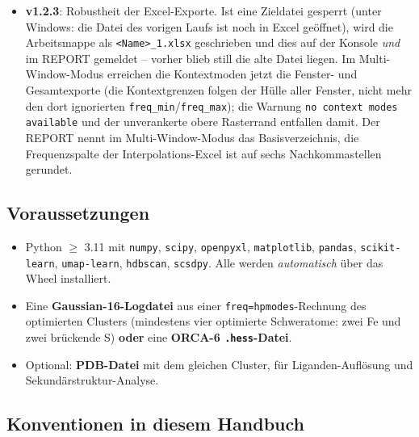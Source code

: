 \documentclass[11pt,a4paper,twoside]{article}
\theoremstyle{remark}
\begin{document}
\begin{infobox}
\begin{itemize}
        verschiedener Fenster und L\"aufe spaltenweise vergleichbar sind;
        nur ein Lauf ohne angeforderten Bereich folgt weiterhin den Daten.
        Betroffen ist die Zahl der f\"uhrenden/abschlie\ss{}enden Zeilen,
        nicht die interpolierten Werte.
  \item \textbf{v1.2.3}: Robustheit der Excel-Exporte. Ist eine
        Zieldatei gesperrt (unter Windows: die Datei des vorigen Laufs
        ist noch in Excel ge\"offnet), wird die Arbeitsmappe als
        \texttt{<Name>\_1.xlsx} geschrieben und dies auf der Konsole
        \emph{und} im REPORT gemeldet -- vorher blieb still die alte
        Datei liegen. Im Multi-Window-Modus erreichen die Kontextmoden
        jetzt die Fenster- und Gesamtexporte (die Kontextgrenzen folgen
        der H\"ulle aller Fenster, nicht mehr den dort ignorierten
        \texttt{freq\_min}/\texttt{freq\_max}); die Warnung
        \texttt{no context modes available} und der unverankerte obere
        Rasterrand entfallen damit. Der REPORT nennt im Multi-Window-Modus
        das Basisverzeichnis, die Frequenzspalte der Interpolations-Excel
        ist auf sechs Nachkommastellen gerundet.
\end{itemize}
\end{infobox}

\subsection{Voraussetzungen}

\begin{itemize}
  \item Python $\geq$ 3.11 mit \texttt{numpy}, \texttt{scipy},
        \texttt{openpyxl}, \texttt{matplotlib}, \texttt{pandas},
        \texttt{scikit-learn}, \texttt{umap-learn}, \texttt{hdbscan},
        \texttt{scsdpy}. Alle werden \emph{automatisch} \"uber das
        Wheel installiert.
  \item Eine \textbf{Gaussian-16-Logdatei} aus einer
        \texttt{freq=hpmodes}-Rechnung des optimierten Clusters
        (mindestens vier optimierte Schweratome: zwei Fe und zwei
        br\"uckende S) \textbf{oder} eine \textbf{ORCA-6
        \texttt{.hess}-Datei}.
  \item Optional: \textbf{PDB-Datei} mit dem gleichen Cluster, f\"ur
        Liganden-Aufl\"osung und Sekund\"arstruktur-Analyse.
\end{itemize}

\subsection{Konventionen in diesem Handbuch}
\end{document}

